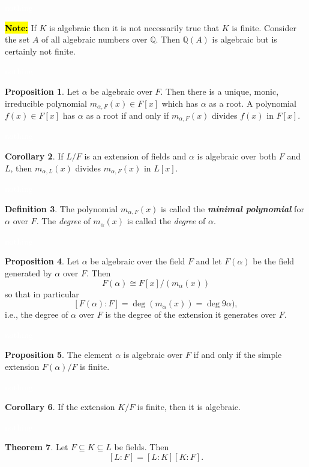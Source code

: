 \documentclass{article}
\theoremstyle{definition}
\newtheorem{thm}{Theorem}[section]
\newtheorem{prop}[thm]{Proposition}
\newtheorem{cor}[thm]{Corollary}
\newtheorem{defn}[thm]{Definition}
\newcommand{\nl}{\textcolor{white}{nothing}}
\newcommand{\seq}{\subseteq}
\newcommand{\Q}{\mathbb{Q}}
\newcommand{\al}{\alpha}
\begin{document}
\nl

\hl{\textbf{Note:}} If $K$ is algebraic then it is not necessarily true that $K$ is finite. Consider the set $A$ of all algebraic numbers over $\Q$. Then $\Q(A)$ is algebraic but is certainly not finite.

\nl

\begin{prop}
Let $\al$ be algebraic over $F$. Then there is a unique, monic, irreducible polynomial $m_{\al,F}(x)\in F[x]$ which has $\al$ as a root. A polynomial $f(x)\in F[x]$ has $\al$ as a root if and only if $m_{\al, F}(x)$ divides $f(x)$ in $F[x]$. 
\end{prop}

\nl

\begin{cor}
If $L/F$ is an extension of fields and $\al$ is algebraic over both $F$ and $L$, then $m_{\al,L}(x)$ divides $m_{\al,F}(x)$ in $L[x]$.
\end{cor}

\nl

\begin{defn}
The polynomial $m_{\al, F}(x)$ is called the \textit{\textbf{minimal polynomial}} for $\al$ over $F$. The \textit{degree} of $m_\al(x)$ is called the \textit{degree} of $\al$.
\end{defn}

\nl

\begin{prop}
Let $\al$ be algebraic over the field $F$ and let $F(\al)$ be the field generated by $\al$ over $F$. Then
\[F(\al) \cong F[x]/(m_\al(x))\]
so that in particular
\[[F(\al):F] = \deg(m_\al(x)) = \deg9\al),\]
i.e., the degree of $\al$ over $F$ is the degree of the extension it generates over $F$.
\end{prop}

\nl

\begin{prop}
The element $\al$ is algebraic over $F$ if and only if the simple extension $F(\al)/F$ is finite.
\end{prop}

\nl

\begin{cor}
If the extension $K/F$ is finite, then it is algebraic.
\end{cor}

\nl

\begin{thm}
Let $F\seq K\seq L$ be fields. Then 
\[[L:F] = [L:K][K:F].\]
\end{thm}
\end{document}
